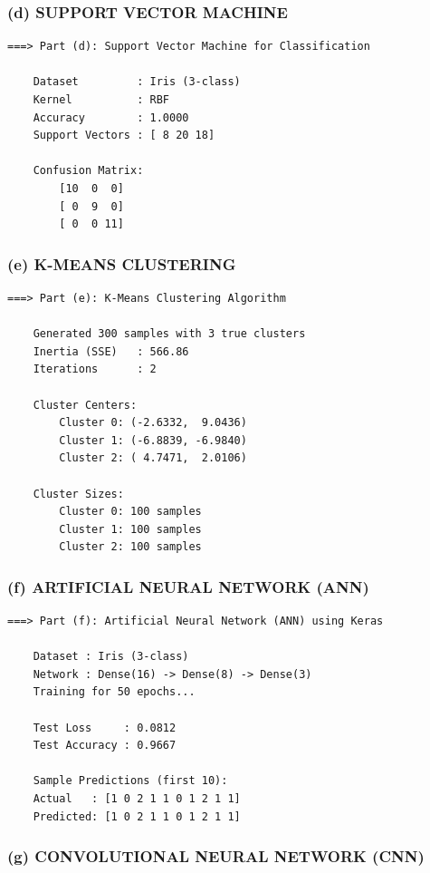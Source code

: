 \documentclass[12pt,a4paper]{article}
\begin{document}
\subsubsection*{(d) SUPPORT VECTOR MACHINE}

\begin{lstlisting}[style=outputstyle]
===> Part (d): Support Vector Machine for Classification

    Dataset         : Iris (3-class)
    Kernel          : RBF
    Accuracy        : 1.0000
    Support Vectors : [ 8 20 18]

    Confusion Matrix:
        [10  0  0]
        [ 0  9  0]
        [ 0  0 11]
\end{lstlisting}

\subsubsection*{(e) K-MEANS CLUSTERING}

\begin{lstlisting}[style=outputstyle]
===> Part (e): K-Means Clustering Algorithm

    Generated 300 samples with 3 true clusters
    Inertia (SSE)   : 566.86
    Iterations      : 2

    Cluster Centers:
        Cluster 0: (-2.6332,  9.0436)
        Cluster 1: (-6.8839, -6.9840)
        Cluster 2: ( 4.7471,  2.0106)

    Cluster Sizes:
        Cluster 0: 100 samples
        Cluster 1: 100 samples
        Cluster 2: 100 samples
\end{lstlisting}

\subsubsection*{(f) ARTIFICIAL NEURAL NETWORK (ANN)}

\begin{lstlisting}[style=outputstyle]
===> Part (f): Artificial Neural Network (ANN) using Keras

    Dataset : Iris (3-class)
    Network : Dense(16) -> Dense(8) -> Dense(3)
    Training for 50 epochs...

    Test Loss     : 0.0812
    Test Accuracy : 0.9667

    Sample Predictions (first 10):
    Actual   : [1 0 2 1 1 0 1 2 1 1]
    Predicted: [1 0 2 1 1 0 1 2 1 1]
\end{lstlisting}

\subsubsection*{(g) CONVOLUTIONAL NEURAL NETWORK (CNN)}
\end{document}
